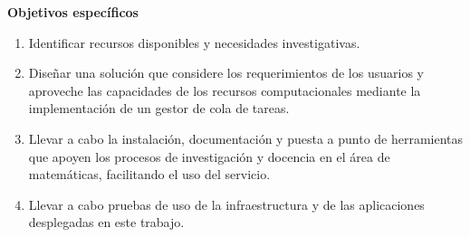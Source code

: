 \begin{doublespace}
\begin{multicols}{2}
    \textbf{Objetivos específicos}
    \begin{enumerate}
        \item Identificar recursos disponibles y necesidades investigativas.
        \item Diseñar una solución que considere los requerimientos de los usuarios y aproveche las capacidades de los recursos computacionales mediante la implementación de un gestor de cola de tareas.
        \item Llevar a cabo la instalación, documentación y puesta a punto de herramientas que apoyen los procesos de investigación y docencia en el área de matemáticas, facilitando el uso del servicio.
        \item  Llevar a cabo pruebas de uso de la infraestructura y de las aplicaciones desplegadas en este trabajo.
    \end{enumerate}
    \vspace{3mm}

\end{multicols}


\end{doublespace}

